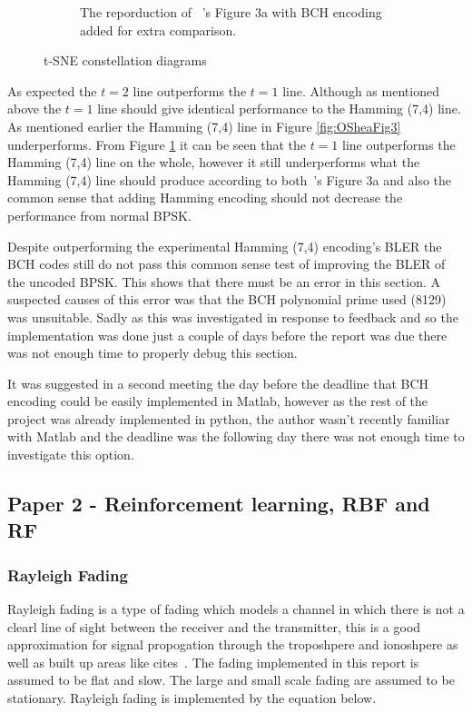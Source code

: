 \documentclass[12pt,onecolumn,letterpaper]{article}
\begin{document}
\begin{figure}[t!]
\begin{subfigure}[t]{0.45\textwidth}
       \caption{The reporduction of ~\cite{oShea}'s Figure 3a with BCH encoding added for extra comparison.}
       \label{fig:OSheaFigure3aBch}
   \end{subfigure}
   \caption{t-SNE constellation diagrams}
   \label{fig:BchFigures}
\end{figure}

As expected the $t=2$ line outperforms the $t=1$ line. Although as mentioned above the $t=1$ line should give identical performance to the Hamming (7,4) line. As mentioned earlier the Hamming (7,4) line in Figure \ref{fig:OSheaFig3} underperforms. From Figure \ref{fig:OSheaFigure3aBch} it can be seen that the $t=1$ line outperforms the Hamming (7,4) line on the whole, however it still underperforms what the Hamming (7,4) line should produce according to both~\cite{oShea}'s Figure 3a and also the common sense that adding Hamming encoding should not decrease the performance from normal BPSK.

Despite outperforming the experimental Hamming (7,4) encoding's BLER the BCH codes still do not pass this common sense test of improving the BLER of the uncoded BPSK. This shows that there must be an error in this section. A suspected causes of this error was that the BCH polynomial prime used (8129) was unsuitable. Sadly as this was investigated in response to feedback and so the implementation was done just a couple of days before the report was due there was not enough time to properly debug this section.  

It was suggested in a second meeting the day before the deadline that BCH encoding could be easily implemented in Matlab, however as the rest of the project was already implemented in python, the author wasn't recently familiar with Matlab and the deadline was the following day there was not enough time to investigate this option. 

\subsection{Paper 2 - Reinforcement learning, RBF and RF}

\subsubsection{Rayleigh Fading}

Rayleigh fading is a type of fading which models a channel in which there is not a clearl line of sight between the receiver and the transmitter, this is a good approximation for signal propogation through the troposhpere and ionoshpere as well as built up areas like cites~\cite{RayleighProakis}. The fading implemented in this report is assumed to be flat and slow. The large and small scale fading are assumed to be stationary. Rayleigh fading is implemented by the equation below.
\end{document}
